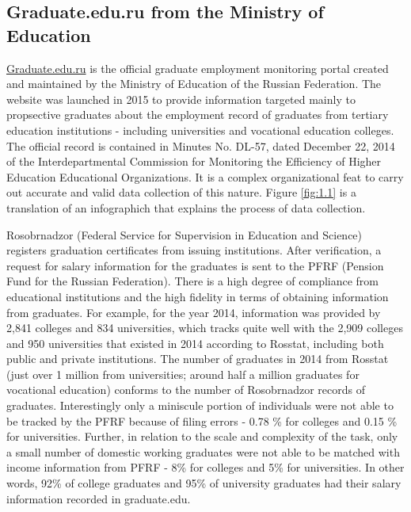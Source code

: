 \documentclass[alpha-refs]{wiley-article-05g}
\begin{document}
\subsection{Graduate.edu.ru from the Ministry of Education}

\url{Graduate.edu.ru} is the official graduate employment monitoring portal created and maintained by the Ministry of Education of the Russian Federation. The website was launched in 2015 to provide information targeted mainly to propsective graduates about the employment record of graduates from tertiary education institutions - including universities and vocational education colleges. The official record is contained in Minutes No. DL-57, dated December 22, 2014 of the Interdepartmental Commission for Monitoring the Efficiency of Higher Education Educational Organizations. It is a complex organizational feat to carry out accurate and valid data collection of this nature. Figure \ref{fig:1.1} is a translation of an infographich that explains the process of data collection. 

\vspace{0.5em}

Rosobrnadzor (Federal Service for Supervision in Education and Science) registers graduation certificates from issuing institutions. After verification, a request for salary information for the graduates is sent to the PFRF (Pension Fund for the Russian Federation).  There is a high degree of compliance from educational institutions and the high fidelity in terms of obtaining information from graduates. For example, for the year 2014, information was provided by 2,841 colleges and 834 universities, which tracks quite well with the 2,909 colleges and 950 universities that existed in 2014 according to Rosstat, including both public and private institutions. The number of graduates in 2014 from Rosstat (just over 1 million from universities; around half a million graduates for vocational education) conforms to the number of Rosobrnadzor records of graduates. Interestingly only a miniscule portion of individuals were not able to be tracked by the PFRF because of filing errors - 0.78 \% for colleges and 0.15 \% for universities. Further, in relation to the scale and complexity of the task, only a  small number of domestic working graduates were not able to be matched with income information from PFRF - 8\% for colleges and 5\% for universities. In other words, 92\% of college graduates and 95\% of university graduates had their salary information recorded in graduate.edu. 
\end{document}
